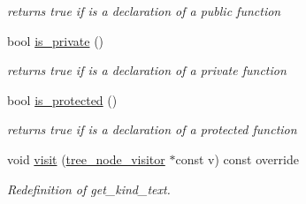 \begin{DoxyCompactItemize}
\begin{DoxyCompactList}\small\item\em returns true if is a declaration of a public function \end{DoxyCompactList}\item 
bool \hyperlink{structfunction__decl_a3dce5abf8fe3368cbd61fb5d925e4379}{is\+\_\+private} ()
\begin{DoxyCompactList}\small\item\em returns true if is a declaration of a private function \end{DoxyCompactList}\item 
bool \hyperlink{structfunction__decl_ad865eb7f91188526497ffe2857e3edb5}{is\+\_\+protected} ()
\begin{DoxyCompactList}\small\item\em returns true if is a declaration of a protected function \end{DoxyCompactList}\item 
void \hyperlink{structfunction__decl_a49389fd3c1df13bb78dbc94e7350462e}{visit} (\hyperlink{classtree__node__visitor}{tree\+\_\+node\+\_\+visitor} $\ast$const v) const override
\begin{DoxyCompactList}\small\item\em Redefinition of get\+\_\+kind\+\_\+text. \end{DoxyCompactList}\end{DoxyCompactItemize}
